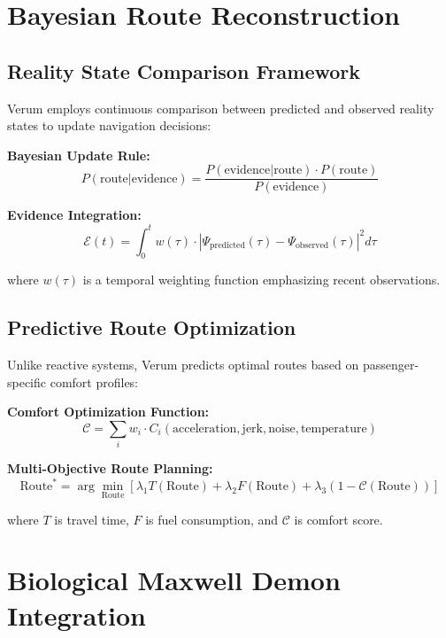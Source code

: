 \documentclass[11pt,a4paper]{article}
\begin{document}
\section{Bayesian Route Reconstruction}

\subsection{Reality State Comparison Framework}

Verum employs continuous comparison between predicted and observed reality states to update navigation decisions:

\textbf{Bayesian Update Rule:}
\begin{equation}
P(\text{route}|\text{evidence}) = \frac{P(\text{evidence}|\text{route}) \cdot P(\text{route})}{P(\text{evidence})}
\end{equation}

\textbf{Evidence Integration:}
\begin{equation}
\mathcal{E}(t) = \int_0^t w(\tau) \cdot |\Psi_{\text{predicted}}(\tau) - \Psi_{\text{observed}}(\tau)|^2 d\tau
\end{equation}

where $w(\tau)$ is a temporal weighting function emphasizing recent observations.

\subsection{Predictive Route Optimization}

Unlike reactive systems, Verum predicts optimal routes based on passenger-specific comfort profiles:

\textbf{Comfort Optimization Function:}
\begin{equation}
\mathcal{C} = \sum_{i} w_i \cdot C_i(\text{acceleration}, \text{jerk}, \text{noise}, \text{temperature})
\end{equation}

\textbf{Multi-Objective Route Planning:}
\begin{equation}
\text{Route}^* = \arg\min_{\text{Route}} [\lambda_1 T(\text{Route}) + \lambda_2 F(\text{Route}) + \lambda_3 (1-\mathcal{C}(\text{Route}))]
\end{equation}

where $T$ is travel time, $F$ is fuel consumption, and $\mathcal{C}$ is comfort score.

\section{Biological Maxwell Demon Integration}
\end{document}
